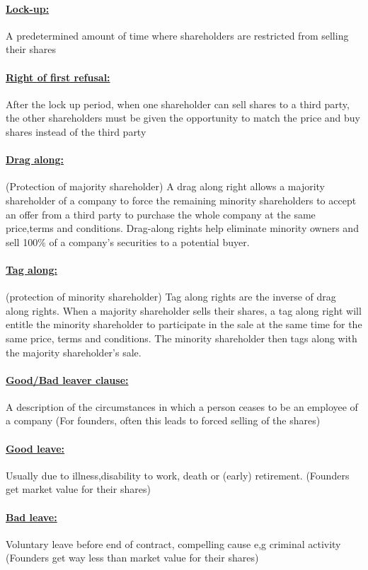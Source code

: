 \documentclass[8pt]{extreport}
\begin{document}
{\paragraph{\underline{Lock-up:}} A predetermined amount of time where shareholders are restricted from selling their shares
\paragraph{\underline{Right of first refusal:}} After the lock up period, when one shareholder can sell shares to a third party, the other shareholders must be given the opportunity to match the price and buy shares instead of the third party
\paragraph{\underline{Drag along:}} (Protection of majority shareholder) A drag along right allows a majority shareholder of a company to force the remaining minority shareholders to accept an offer from a third party to purchase the whole company at the same price,terms and conditions. Drag-along rights help eliminate minority owners and sell 100$\%$ of a company's securities to a potential buyer.
\paragraph{\underline{Tag along:}} (protection of minority shareholder) Tag along rights are the inverse of drag along rights. When a majority shareholder sells their shares, a tag along right will entitle the minority shareholder to participate in the sale at the same time for the same price, terms and conditions. The minority shareholder then tags along with the majority shareholder's sale.
\paragraph{\underline{Good/Bad leaver clause:}} A description of the circumstances in which a person ceases to be an employee of a company (For founders, often this leads to forced selling of the shares)
\paragraph{\underline{Good leave:}} Usually due to illness,disability to work, death or (early) retirement. (Founders get market value for their shares)
\paragraph{\underline{Bad leave:}} Voluntary leave before end of contract, compelling cause e,g criminal activity (Founders get way less than market value for their shares)
}
\end{document}
